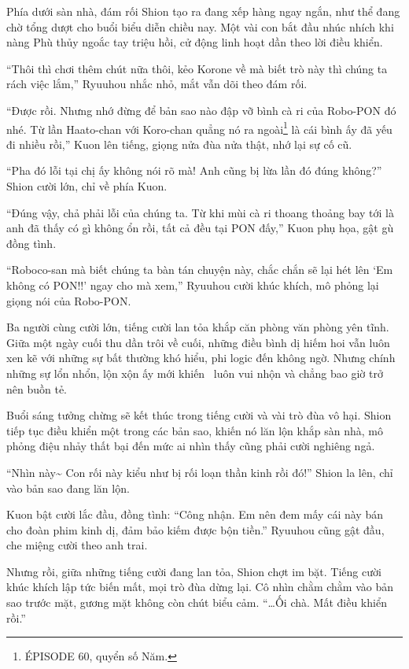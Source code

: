 \documentclass[../main.tex]{subfiles}
\begin{document}
Phía dưới sàn nhà, đám rối Shion tạo ra đang xếp hàng ngay ngắn, như thể đang chờ tổng dượt cho buổi biểu diễn chiều nay. Một vài con bắt đầu nhúc nhích khi nàng Phù thủy ngoắc tay triệu hồi, cử động linh hoạt dần theo lời điều khiển.

``Thôi thì chơi thêm chút nữa thôi, kẻo Korone về mà biết trò này thì chúng ta rách việc lắm,'' Ryuuhou nhắc nhỏ, mắt vẫn dõi theo đám rối.

``Được rồi. Nhưng nhớ đừng để bản sao nào đập vỡ bình cà ri của Robo-PON đó nhé. Từ lần Haato-chan với Koro-chan quẳng nó ra ngoài\footnote{{\flaregothic ÉPISODE 60}, quyển số Năm.} là cái bình ấy đã yếu đi nhiều rồi,'' Kuon lên tiếng, giọng nửa đùa nửa thật, nhớ lại sự cố cũ.

``Pha đó lỗi tại chị ấy không nói rõ mà! Anh cũng bị lừa lần đó đúng không?'' Shion cười lớn, chỉ về phía Kuon.

``Đúng vậy, chả phải lỗi của chúng ta. Từ khi mùi cà ri thoang thoảng bay tới là anh đã thấy có gì không ổn rồi, tất cả đều tại PON đấy,'' Kuon phụ họa, gật gù đồng tình.

``Roboco-san mà biết chúng ta bàn tán chuyện này, chắc chắn sẽ lại hét lên `Em không có PON!!' ngay cho mà xem,'' Ryuuhou cười khúc khích, mô phỏng lại giọng nói của Robo-PON.

Ba người cùng cười lớn, tiếng cười lan tỏa khắp căn phòng văn phòng yên tĩnh. Giữa một ngày cuối thu dần trôi về cuối, những điều bình dị hiếm hoi vẫn luôn xen kẽ với những sự bất thường khó hiểu, phi logic đến không ngờ. Nhưng chính những sự lổn nhổn, lộn xộn ấy mới khiến \hll\ luôn vui nhộn và chẳng bao giờ trở nên buồn tẻ.

Buổi sáng tưởng chừng sẽ kết thúc trong tiếng cười và vài trò đùa vô hại. Shion tiếp tục điều khiển một trong các bản sao, khiến nó lăn lộn khắp sàn nhà, mô phỏng điệu nhảy thất bại đến mức ai nhìn thấy cũng phải cười nghiêng ngả.

``Nhìn này\~{} Con rối này kiểu như bị rối loạn thần kinh rồi đó!'' Shion la lên, chỉ vào bản sao đang lăn lộn.

Kuon bật cười lắc đầu, đồng tình: ``Công nhận. Em nên đem mấy cái này bán cho đoàn phim kinh dị, đảm bảo kiếm được bộn tiền.'' Ryuuhou cũng gật đầu, che miệng cười theo anh trai.

Nhưng rồi, giữa những tiếng cười đang lan tỏa, Shion chợt im bặt. Tiếng cười khúc khích lập tức biến mất, mọi trò đùa dừng lại. Cô nhìn chằm chằm vào bản sao trước mặt, gương mặt không còn chút biểu cảm. ``\dots Ối chà. Mất điều khiển rồi.''
\end{document}
